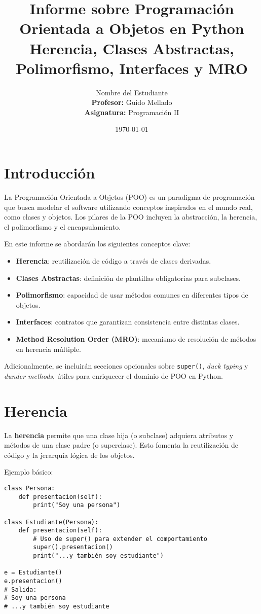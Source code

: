\documentclass[a4paper,12pt]{article}
\title{\Huge Informe sobre Programación Orientada a Objetos en Python \\[0.2cm]
\large Herencia, Clases Abstractas, Polimorfismo, Interfaces y MRO}
\author{Nombre del Estudiante \\[0.2cm]
\textbf{Profesor:} Guido Mellado \\[0.2cm]
\textbf{Asignatura:} Programación II}
\date{\today}
\begin{document}
\maketitle
\thispagestyle{empty}
\newpage

\tableofcontents
\newpage

\section{Introducción}
La Programación Orientada a Objetos (POO) es un paradigma de programación que busca modelar el software utilizando conceptos inspirados en el mundo real, como clases y objetos.  
Los pilares de la POO incluyen la abstracción, la herencia, el polimorfismo y el encapsulamiento.  

En este informe se abordarán los siguientes conceptos clave:
\begin{itemize}
    \item \textbf{Herencia}: reutilización de código a través de clases derivadas.
    \item \textbf{Clases Abstractas}: definición de plantillas obligatorias para subclases.
    \item \textbf{Polimorfismo}: capacidad de usar métodos comunes en diferentes tipos de objetos.
    \item \textbf{Interfaces}: contratos que garantizan consistencia entre distintas clases.
    \item \textbf{Method Resolution Order (MRO)}: mecanismo de resolución de métodos en herencia múltiple.
\end{itemize}

Adicionalmente, se incluirán secciones opcionales sobre \texttt{super()}, \textit{duck typing} y \textit{dunder methods}, útiles para enriquecer el dominio de POO en Python.

\section{Herencia}
La \textbf{herencia} permite que una clase hija (o subclase) adquiera atributos y métodos de una clase padre (o superclase). Esto fomenta la reutilización de código y la jerarquía lógica de los objetos.

Ejemplo básico:

\begin{lstlisting}
class Persona:
    def presentacion(self):
        print("Soy una persona")

class Estudiante(Persona):
    def presentacion(self):
        # Uso de super() para extender el comportamiento
        super().presentacion()
        print("...y también soy estudiante")

e = Estudiante()
e.presentacion()
# Salida:
# Soy una persona
# ...y también soy estudiante
\end{lstlisting}
\end{document}
